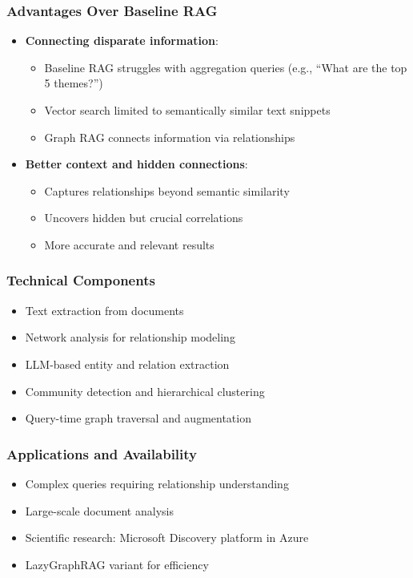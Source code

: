 \documentclass[11pt,letterpaper]{article}
\begin{document}
\subsubsection{Advantages Over Baseline RAG}
\begin{itemize}[leftmargin=*]
    \item \textbf{Connecting disparate information}:
    \begin{itemize}
        \item Baseline RAG struggles with aggregation queries (e.g., ``What are the top 5 themes?'')
        \item Vector search limited to semantically similar text snippets
        \item Graph RAG connects information via relationships
    \end{itemize}
    \item \textbf{Better context and hidden connections}:
    \begin{itemize}
        \item Captures relationships beyond semantic similarity
        \item Uncovers hidden but crucial correlations
        \item More accurate and relevant results
    \end{itemize}
\end{itemize}

\subsubsection{Technical Components}
\begin{itemize}[leftmargin=*]
    \item Text extraction from documents
    \item Network analysis for relationship modeling
    \item LLM-based entity and relation extraction
    \item Community detection and hierarchical clustering
    \item Query-time graph traversal and augmentation
\end{itemize}

\subsubsection{Applications and Availability}
\begin{itemize}[leftmargin=*]
    \item Complex queries requiring relationship understanding
    \item Large-scale document analysis
    \item Scientific research: Microsoft Discovery platform in Azure
    \item LazyGraphRAG variant for efficiency
\end{itemize}
\end{document}
